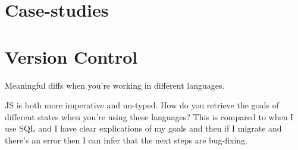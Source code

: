 \documentclass[
]{article}
\begin{document}
\section{Case-studies}\label{case-studies}

\section{Version Control}\label{version-control}

Meaningful diffs when you're working in different languages.

JS is both more imperative and un-typed. How do you retrieve the goals
of different states when you're using these languages? This is compared
to when I use SQL and I have clear explications of my goals and then if
I migrate and there's an error then I can infer that the next steps are
bug-fixing.
\end{document}
